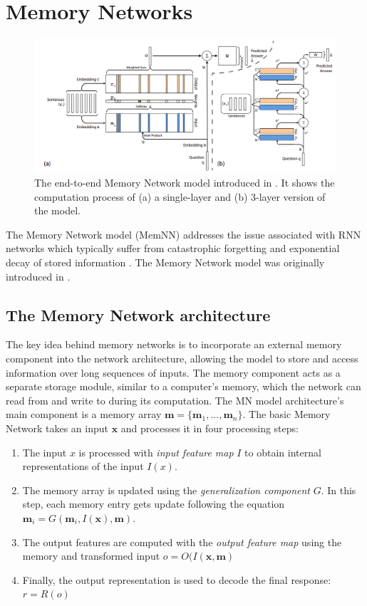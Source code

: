 \section{Memory Networks}
\label{02:sec:mem_nn}
\begin{figure}[t]
    \centering
    \includegraphics[width=\textwidth]{images/e2e_mem_nn.png}
    \caption{The end-to-end Memory Network model introduced in \citet{sukhbaatar2015end}. It shows the computation process of (a) a single-layer and (b) 3-layer version of the model. }
    \label{fig:e2e_memnn}
\end{figure}
The Memory Network model (MemNN) addresses the issue associated with RNN networks which typically suffer from catastrophic forgetting and exponential decay of stored information \cite{neil2016phased}.
The Memory Network model was originally introduced in \citet{DBLP:journals/corr/WestonCB14}.
\subsection{The Memory Network architecture}
The key idea behind memory networks is to incorporate an external memory component into the network architecture, allowing the model to store and access information over long sequences of inputs.
The memory component acts as a separate storage module, similar to a computer's memory, which the network can read from and write to during its computation.
The MN model architecture's main component is a memory array $\mathbf{m} = \{\mathbf{m}_1,...,\mathbf{m}_n\}$.
The basic Memory Network takes an input $\mathbf{x}$ and processes it in four processing steps:
\begin{enumerate}
    \item The input $x$ is processed with \emph{input feature map} $I$ to obtain internal representations of the input $I(x)$.
    \item The memory array is updated using the \emph{generalization component} $G$. In this step, each memory entry gets update following the equation $\mathbf{m}_i = G(\mathbf{m}_i, I(\mathbf{x}), \mathbf{m})$.
    \item The output features are computed with the \emph{output feature map} using the memory and transformed input $ o = O(I(\mathbf{x}, \mathbf{m})$
    \item Finally, the output representation is used to decode the final response: $r = R(o)$
\end{enumerate}

